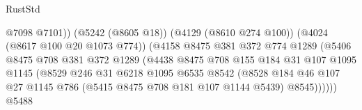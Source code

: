 \begin{lexlean}{RustStd}
\begin{coremodule}
{\begin{coremodule}
{{{{{{{{{{{{{{                                                    @7098
                                                    @7101))
                                                (@5242 (@8605 @18))
                                                (@4129 (@8610 @274 @100))
                                                (@4024 (@8617 @100 @20 @1073 @774))
                                                (@4158
                                                  @8475
                                                  @381
                                                  @372
                                                  @774
                                                  @1289
                                                  (@5406
                                                    @8475
                                                    @708
                                                    @381
                                                    @372
                                                    @1289
                                                    (@4438
                                                      @8475
                                                      @708
                                                      @155
                                                      @184
                                                      @31
                                                      @107
                                                      @1095
                                                      @1145
                                                      (@8529
                                                        @246
                                                        @31
                                                        @6218
                                                        @1095
                                                        @6535
                                                        @8542
                                                        (@8528
                                                          @184
                                                          @46
                                                          @107
                                                          @27
                                                          @1145
                                                          @786
                                                          (@5415 @8475 @708 @181 @107 @1144 @5439)
                                                          @8545))))))
                                              @5488
}}}}}}}}}}}}}}
\end{coremodule}}
\end{coremodule}
\end{lexlean}
